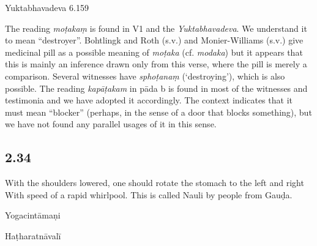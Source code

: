 \begin{ekdosis}
\begin{testimonia}[hp02_033]
Yuktabhavadeva 6.159

\begin{versinnote}
\end{versinnote}
\end{testimonia}

\begin{philcomm}[hp02_033]
The reading \emph{moṭakaṃ} is found in V1 and the \emph{Yuktabhavadeva}. We understand it to mean “destroyer”. Bohtlingk and Roth (s.v.) and Monier-Williams (s.v.) give medicinal pill as a possible meaning of \emph{moṭaka} (cf. \emph{modaka}) but it appears that this is mainly an inference drawn only from this verse, where the pill is merely a comparison. Several witnesses have \emph{sphoṭanaṃ} (‘destroying’), which is also possible. The reading \emph{kapāṭakam} in pāda b is found in most of the witnesses and testimonia and we have adopted it accordingly. The context indicates that it must mean “blocker” (perhaps, in the sense of a door that blocks something), but we have not found any parallel usages of it in this sense.
\end{philcomm}

\subsection*{2.34}
\begin{translation}[hp02_034]
With the shoulders lowered, one should rotate the stomach to the left and right With speed of a rapid whirlpool. This is called Nauli by people from Gauḍa.
\end{translation}

\begin{sources}[hp02_034]
\end{sources}

\begin{testimonia}[hp02_034]
Yogacintāmaṇi

\begin{versinnote}
\end{versinnote}

Haṭharatnāvalī

\begin{versinnote}
\end{versinnote}
\end{testimonia}


\end{ekdosis}

